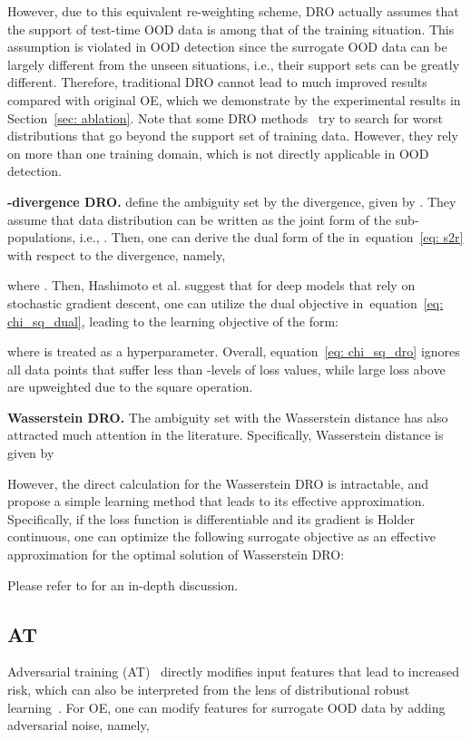\documentclass{article} \usepackage{iclr2022_conference,times}
\def\eqref#1{equation~\ref{#1}}
\begin{document}
However, due to this equivalent re-weighting scheme, DRO actually assumes that the support of test-time OOD data is among that of the training situation. This assumption is violated in OOD detection since the surrogate OOD data can be largely different from the unseen situations, i.e., their support sets can be greatly different. Therefore, traditional DRO cannot lead to much improved results compared with original OE, which we demonstrate by the experimental results in Section~\ref{sec: ablation}. {Note that some DRO methods~\citep{krueger2021out} try to search for worst distributions that go beyond the support set of training data. However, they rely on more than one training domain, which is not directly applicable in OOD detection. }


\textbf{-divergence DRO.} \cite{hashimoto2018fairness} define the ambiguity set by the  divergence, given by . They assume that data distribution can be written as the joint form of the sub-populations, i.e., . Then, one can derive the dual form of the  in~\eqref{eq: s2r} with respect to the  divergence, namely,

where . Then, Hashimoto et al. suggest that for  deep models that rely on stochastic gradient descent, one can utilize the dual objective in~\eqref{eq: chi_sq_dual}, leading to the learning objective of the form:

where  is treated as a hyperparameter. Overall, \eqref{eq: chi_sq_dro} ignores all data points that suffer less than -levels of loss values, while large loss above  are upweighted due to the square operation. 


\textbf{Wasserstein DRO.} The ambiguity set with the Wasserstein distance has also attracted much attention in the literature. Specifically, Wasserstein distance is given by 

However, the direct calculation for the Wasserstein DRO is intractable, and \cite{KwonKWP20} propose a simple learning method that leads to its effective approximation. Specifically, if the loss function is differentiable and its gradient is Holder continuous, one can optimize the following surrogate objective as an effective approximation for the optimal solution of Wasserstein DRO:

Please refer to \citep{KwonKWP20} for an in-depth discussion. 










\subsection{AT}
Adversarial training (AT)~\citep{MadryMSTV18} directly modifies input features that lead to increased risk, which can also be interpreted from the lens of distributional robust learning~\citep{SinhaND18}. For OE, one can modify features for surrogate OOD data by adding adversarial noise, namely,
\end{document}
